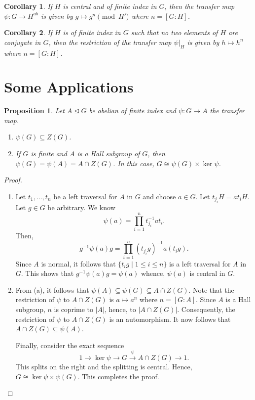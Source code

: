 \documentclass[12pt]{article}
\theoremstyle{thmstyle}
\newtheorem{proposition}[theorem]{Proposition}
\theoremstyle{defstyle}
\newtheorem*{corollary}{Corollary}
\renewcommand{\le}{\leqslant}
\begin{document}
\begin{corollary}
    If $H$ is central and of finite index in $G$, then the transfer map $\psi: G\to H^{ab}$ is given by $g\mapsto g^n\pmod{H'}$ where $n = [G : H]$.
\end{corollary}

\begin{corollary}
    If $H$ is of finite index in $G$ such that no two elements of $H$ are conjugate in $G$, then the restriction of the transfer map $\psi|_H$ is given by $h\mapsto h^n$ where $n = [G: H]$.
\end{corollary}

\section{Some Applications}

\begin{proposition}
    Let $A\unlhd G$ be abelian of finite index and $\psi: G\to A$ the transfer map. 
    \begin{enumerate}[label=(\alph*)]
        \item $\psi(G)\subseteq Z(G)$.
        \item If $G$ is finite and $A$ is a Hall subgroup of $G$, then $\psi(G) = \psi(A) = A\cap Z(G)$. In this case, $G\cong\psi(G)\times\ker\psi$.
    \end{enumerate}
\end{proposition}
\begin{proof}
\begin{enumerate}[label=(\alph*)]
    \item Let $t_1,\dots,t_n$ be a left traversal for $A$ in $G$ and choose $a\in G$. Let $t_{j_i}H = at_i H$. Let $g\in G$ be arbitrary. We know 
    \begin{equation*}
        \psi(a) = \prod_{i = 1}^n t_{j_i}^{-1}at_i.
    \end{equation*}
    Then, 
    \begin{equation*}
        g^{-1}\psi(a)g = \prod_{i = 1}^n (t_{j_i}g)^{-1}a(t_ig).
    \end{equation*}
    Since $A$ is normal, it follows that $\{t_ig\mid 1\le i\le n\}$ is a left traversal for $A$ in $G$. This shows that $g^{-1}\psi(a)g = \psi(a)$ whence, $\psi(a)$ is central in $G$.

    \item From (a), it follows that $\psi(A)\subseteq\psi(G)\subseteq A\cap Z(G)$. Note that the restriction of $\psi$ to $A\cap Z(G)$ is $a\mapsto a^n$ where $n = [G : A]$. Since $A$ is a Hall subgroup, $n$ is coprime to $|A|$, hence, to $|A\cap Z(G)|$. Consequently, the restriction of $\psi$ to $A\cap Z(G)$ is an automorphism. It now follows that $A\cap Z(G)\subseteq\psi(A)$.

    Finally, consider the exact sequence 
    \begin{equation*}
        1\to \ker\psi\to G\xrightarrow{\psi} A\cap Z(G)\to 1.
    \end{equation*}
    This splits on the right and the splitting is central. Hence, $G\cong\ker\psi\times\psi(G)$. This completes the proof.
\end{enumerate}
\end{proof}
\end{document}
